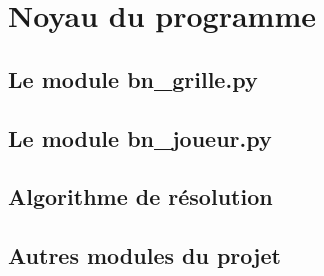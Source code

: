 \chapter{Noyau du programme}

\section{Le module bn\_grille.py}

\section{Le module bn\_joueur.py}

\section{Algorithme de résolution}

\section{Autres modules du projet}




